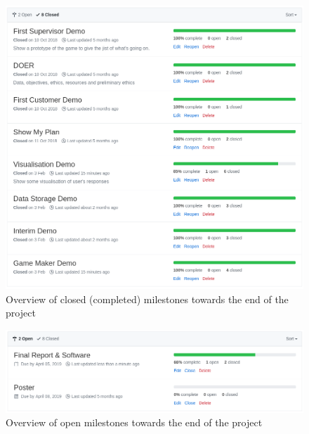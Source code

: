 \begin{figure}[!h]
	\centering
	\includegraphics[width=1.0\textwidth]{./images/softeng/closed_milestones.png}
	\caption{Overview of closed (completed) milestones towards the end of the project}
	\label{fig:closed_milestones}
\end{figure}

\begin{figure}[!h]
	\centering
	\includegraphics[width=1.0\textwidth]{./images/softeng/open_milestones.png}
	\caption{Overview of open milestones towards the end of the project}
	\label{fig:open_milestones}
\end{figure}

